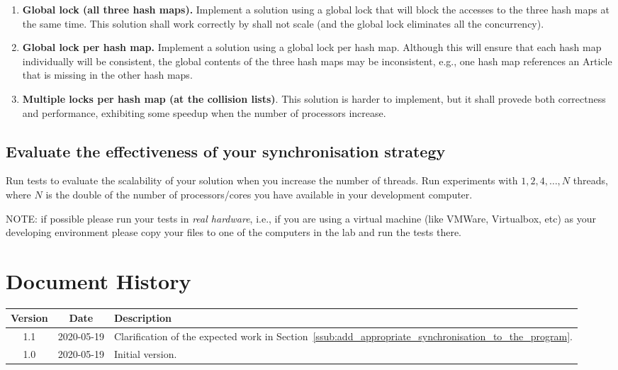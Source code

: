 \documentclass[a4paper,12pt]{article}
\begin{document}
\begin{enumerate}
  \item \textbf{Global lock (all three hash maps).} Implement a solution using a global lock that will block the accesses to the three hash maps at the same time.  This solution shall work correctly by shall not scale (and the global lock eliminates all the concurrency).
  \item \textbf{Global lock per hash map.} Implement a solution using a global lock per hash map.  Although this will ensure that each hash map individually will be consistent, the global contents of the three hash maps may be inconsistent, e.g., one hash map references an Article that is missing in the other hash maps.
  \item \textbf{Multiple locks per hash map (at the collision lists)}.  This solution is harder to implement, but it shall provede both correctness and performance, exhibiting some speedup when the number of processors increase.
\end{enumerate}


\subsection{Evaluate the effectiveness of your synchronisation strategy} %
\label{ssub:evaluate_the_effectiveness_of_your_synchronization_strategy}

Run tests to evaluate the scalability of your solution when you increase the number of threads. Run experiments with $1, 2, 4, \ldots, N$ threads, where $N$ is the double of the number of processors/cores you have available in your development computer. 

NOTE: if possible please run your tests in \emph{real hardware}, i.e., if you are using a virtual machine (like VMWare, Virtualbox, etc) as your developing environment please copy your files to one of the computers in the lab and run the tests there.



\section*{Document History} %
\label{sec:document_history}

\begin{tabularx}{\linewidth}{ccX}
  \toprule
  \textbf{Version} & \textbf{Date} & \textbf{Description}\\
  \midrule
  1.1 & 2020-05-19 & Clarification of the expected work in Section~\ref{ssub:add_appropriate_synchronisation_to_the_program}.\\
  1.0 & 2020-05-19 & Initial version.\\
  \bottomrule
\end{tabularx}


\end{document}
